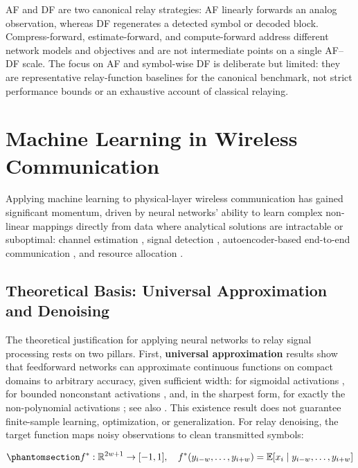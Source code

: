 AF and DF are two canonical relay strategies: AF linearly forwards an analog observation, whereas DF regenerates a detected symbol or decoded block. Compress-forward, estimate-forward, and compute-forward address different network models and objectives and are not intermediate points on a single AF--DF scale. The focus on AF and symbol-wise DF is deliberate but limited: they are representative relay-function baselines for the canonical benchmark, not strict performance bounds or an exhaustive account of classical relaying.

\section{Machine Learning in Wireless Communication}\label{sec:machine-learning-in-wireless-communication}

Applying machine learning to physical-layer wireless communication has gained significant momentum, driven by neural networks' ability to learn complex non-linear mappings directly from data where analytical solutions are intractable or suboptimal: channel estimation \cite{YeLiJuang2018OFDMDL}, signal detection \cite{SamuelDiskinWunder2019MIMODetect}, autoencoder-based end-to-end communication \cite{Dorner2018OverTheAirDL}, and resource allocation \cite{Sun2018LearnToOptimize}.

\subsection{Theoretical Basis: Universal Approximation and Denoising}\label{sec:theoretical-basis-universal-approximation-and-denoising}

The theoretical justification for applying neural networks to relay signal processing rests on two pillars. First, \textbf{universal approximation} results show that feedforward networks can approximate continuous functions on compact domains to arbitrary accuracy, given sufficient width: for sigmoidal activations \cite{Cybenko1989UAT}, for bounded nonconstant activations \cite{Hornik1991UAT}, and, in the sharpest form, for exactly the non-polynomial activations \cite{Leshno1993UAT}; see also \cite{GoodfellowBengioCourville2016DeepLearning}. This existence result does not guarantee finite-sample learning, optimization, or generalization. For relay denoising, the target function maps noisy observations to clean transmitted symbols:

\begin{equation}\protect\phantomsection\label{eq:optimal-denoiser}{f^*: \mathbb{R}^{2w+1} \to [-1, 1], \quad f^*(y_{i-w}, \dots, y_{i+w}) = \mathbb{E}[x_i \mid y_{i-w}, \dots, y_{i+w}]
}\end{equation}

